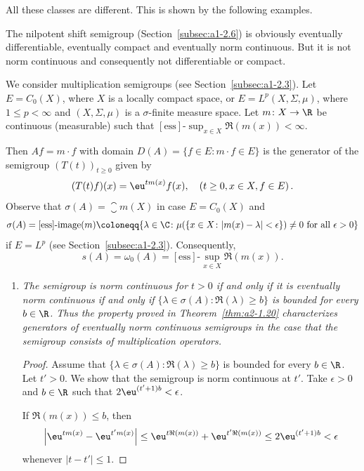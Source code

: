 All these classes are different.
This is shown by the following examples.
\begin{example}\label{ex:a2-1.27}
The nilpotent shift semigroup (Section~\ref{subsec:a1-2.6}) is obviously eventually differentiable, eventually compact and eventually norm continuous.
But it is not norm continuous and consequently not differentiable or compact.
\end{example}
\begin{example}\label{ex:a2-1.28}
We consider multiplication semigroups (see Section~\ref{subsec:a1-2.3}).
Let $E = C_{0}(X)$, where $X$ is a locally compact space, or $E = L^{p}(X,\Sigma,\mu)$, where $1 \leq p < \infty$ and $(X,\Sigma,\mu)$ is a $\sigma$-finite measure space.
Let $m \colon X \to \R$ be continuous (\resp measurable) such that $[\text{ess}]\text{-}\sup_{x \in X} \Re(m(x)) < \infty$.

Then $Af = m \cdot f$ with domain $D(A) = \{f \in E \colon m \cdot f \in E\}$ is the generator of the semigroup $(T(t))_{t \geq 0}$ given by
\[
    (T(t)f)(x) = \eu^{tm(x)}f(x), \quad (t \geq 0, x \in X, f \in E )\, .
\]
Observe that $\sigma(A) = \closure{m(X)}$ in case $E = C_{0}(X)$ and 
\[
\sigma(A) = [\text{ess}]\text{-}\text{image}(m) \coloneqq \{\lambda \in \C \colon \mu(\{x \in X \colon |m(x)-\lambda| < \epsilon\}) \neq 0 \text{ for all } \epsilon > 0\} 
\]
if\/ $E = L^{p}$ (see Section~\ref{subsec:a1-2.3}).
Consequently, 
%
\[
	s(A) = \omega_{0}(A) = [\text{ess}]\text{-}\sup_{x \in X} \Re(m(x)).
\]
%
\begin{enumerate}[\upshape (i), wide, labelindent=.25em]
\item \label{ex:a2-1.28-1}
\textit{The semigroup is norm continuous for $t > 0$ if and only if it is eventually norm continuous if and only if 
$\{\lambda \in \sigma(A) \colon \Re(\lambda) \geq b\}$ 
is bounded for every $b \in \R$.
Thus the property proved in Theorem~\ref{thm:a2-1.20}   characterizes generators of eventually norm continuous semigroups in the case that the semigroup consists of multiplication operators.}
\begin{proof}
Assume that $\{\lambda \in \sigma(A) \colon \Re(\lambda) \geq b\}$ is bounded for every $b \in \R$.
Let $t' > 0$.
We show that the semigroup is norm continuous at $t'$.
Take $\epsilon > 0$ and $b \in \R$ such that $2\eu^{(t'+1)b} < \epsilon$.

If\/ $\Re(m(x)) \leq b$, then
\[
    \left|\eu^{tm(x)} - \eu^{t'm(x)}\right| \leq \eu^{t\Re(m(x))} + \eu^{t'\Re(m(x))} \leq 2\eu^{(t'+1)b} < \epsilon
\]
whenever $|t-t'| \leq 1$.


\end{proof}
\end{enumerate}
\end{example}
